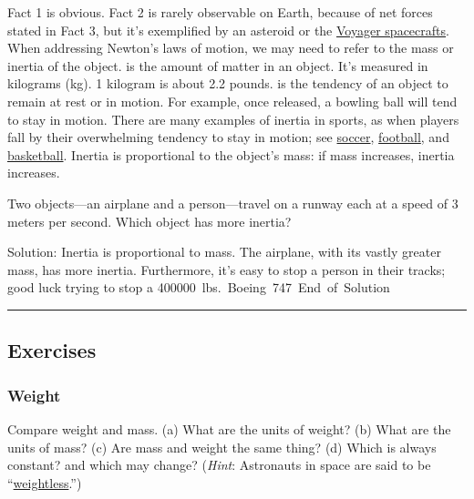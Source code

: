 \documentclass[]{article}
\begin{document}
Fact 1 is obvious. Fact 2 is rarely observable on Earth, because of net forces stated in Fact 3, but it's exemplified by an asteroid or the \href{https://voyager.jpl.nasa.gov/mission/status/}{Voyager spacecrafts}. When addressing Newton's laws of motion, we may need to refer to the mass or inertia of the object.  is the amount of matter in an object. It's measured in kilograms (kg). 1 kilogram is about 2.2 pounds.  is the tendency of an object to remain at rest or in motion. For example, once released, a bowling ball will tend to stay in motion. There are many examples of inertia in sports, as when players fall by their overwhelming tendency to stay in motion; see \href{https://youtu.be/5PKXs8i_zSw?t=21}{soccer}, \href{https://youtu.be/4TgpW0WZZ6U?t=55}{football}, and \href{https://youtu.be/IGBpvIXGMYQ?t=26}{basketball}. Inertia is proportional to the object's mass: if mass increases, inertia increases.

\begin{example}
Two objects---an airplane and a person---travel on a runway each at a speed of 3 meters per second. Which object has more inertia?
\end{example}

Solution: Inertia is proportional to mass. The airplane, with its vastly greater mass, has more inertia. Furthermore, it's easy to stop a person in their tracks; good luck trying to stop a \SI{400000}{lbs.} Boeing 747.

End of Solution.

\vspace{1em}

\hrule


\subsection{Exercises}

\subsubsection*{Weight}

\begin{exercise}
Compare weight and mass. (a) What are the units of weight? (b) What are the units of mass? (c) Are mass and weight the same thing? (d) Which is always constant? and which may change? (\textit{Hint}: Astronauts in space are said to be ``\href{https://youtu.be/C3GC5LS6e6Q}{weightless}.'')
\end{exercise}
\end{document}
